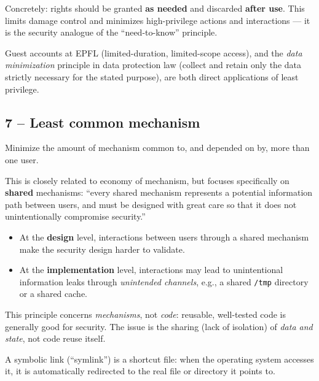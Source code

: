 Concretely: rights should be granted \textbf{as needed} and discarded \textbf{after use}. This limits damage control and minimizes high-privilege actions and interactions --- it is the security analogue of the ``need-to-know'' principle.

\begin{example}
Guest accounts at EPFL (limited-duration, limited-scope access), and the \emph{data minimization} principle in data protection law (collect and retain only the data strictly necessary for the stated purpose), are both direct applications of least privilege.
\end{example}

\subsection{7 -- Least common mechanism}

\begin{definition}
Minimize the amount of mechanism common to, and depended on by, more than one user.
\end{definition}

\begin{remark}
This is closely related to economy of mechanism, but focuses specifically on \textbf{shared} mechanisms: ``every shared mechanism represents a potential information path between users, and must be designed with great care so that it does not unintentionally compromise security.''
\begin{itemize}
    \item At the \textbf{design} level, interactions between users through a shared mechanism make the security design harder to validate.
    \item At the \textbf{implementation} level, interactions may lead to unintentional information leaks through \emph{unintended channels}, e.g., a shared \texttt{/tmp} directory or a shared cache.
\end{itemize}
This principle concerns \emph{mechanisms}, not \emph{code}: reusable, well-tested code is generally good for security. The issue is the sharing (lack of isolation) of \emph{data and state}, not code reuse itself.
\end{remark}

\begin{remark}
A symbolic link (``symlink'') is a shortcut file: when the operating system accesses it, it is automatically redirected to the real file or directory it points to.
\end{remark}

